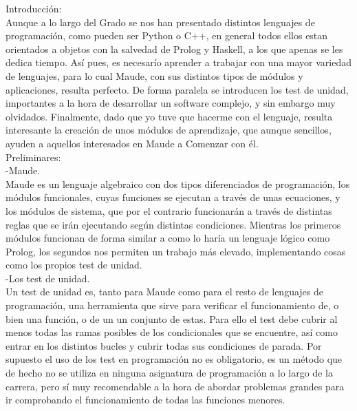 
Introducción: \\

Aunque a lo largo del Grado se nos han presentado distintos lenguajes de programación, como pueden ser Python o C++, en general todos ellos estan orientados a objetos con la salvedad de Prolog y Haskell, a los que apenas se les dedica tiempo. Así pues, es necesarío aprender a trabajar con una mayor variedad de lenguajes, para lo cual Maude, con sus distintos tipos de módulos y aplicaciones, resulta perfecto. De forma paralela se introducen los test de unidad, importantes a la hora de desarrollar un software complejo, y sin embargo muy olvidados. Finalmente, dado que yo tuve que hacerme con el lenguaje, resulta interesante la creación de unos módulos de aprendizaje, que aunque sencillos, ayuden a aquellos interesados en Maude a Comenzar con él. \\

Preliminares: \\

-Maude. \\

Maude es un lenguaje algebraico con dos tipos diferenciados de programación, los módulos funcionales, cuyas funciones se ejecutan a través de unas ecuaciones, y los módulos de sistema, que por el contrario funcionarán a través de distintas reglas que se irán ejecutando según distintas condiciones. Mientras los primeros módulos funcionan de forma similar a como lo haría un lenguaje lógico como Prolog, los segundos nos permiten un trabajo más elevado, implementando cosas como los propios test de unidad.\\

-Los test de unidad.\\

Un test de unidad es, tanto para Maude como para el resto de lenguajes de programación, una herramienta que sirve para verificar el funcionamiento de, o bien una función, o de un un conjunto de estas. Para ello el test debe cubrir al menos todas las ramas posibles de los condicionales que se encuentre, así como entrar en los distintos bucles y cubrir todas sus condiciones de parada. Por supuesto el uso de los test en programación no es obligatorio, es un método que de hecho no se utiliza en ninguna asignatura de programación a lo largo de la carrera, pero sí muy recomendable a la hora de abordar problemas grandes para ir comprobando el funcionamiento de todas las funciones menores.\\

